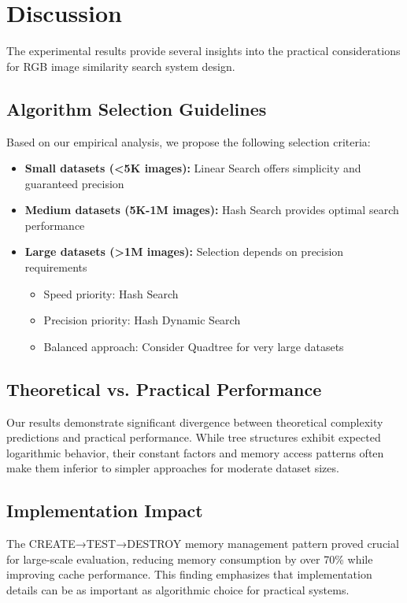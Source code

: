 \documentclass{sbc2023}
\begin{document}
\begin{table}[H]
\section{Discussion}
\label{sec:discussion}

The experimental results provide several insights into the practical considerations for RGB image similarity search system design.

\subsection{Algorithm Selection Guidelines}

Based on our empirical analysis, we propose the following selection criteria:

\begin{itemize}
    \item \textbf{Small datasets (<5K images):} Linear Search offers simplicity and guaranteed precision
    \item \textbf{Medium datasets (5K-1M images):} Hash Search provides optimal search performance
    \item \textbf{Large datasets (>1M images):} Selection depends on precision requirements
    \begin{itemize}
        \item Speed priority: Hash Search
        \item Precision priority: Hash Dynamic Search  
        \item Balanced approach: Consider Quadtree for very large datasets
    \end{itemize}
\end{itemize}

\subsection{Theoretical vs. Practical Performance}

Our results demonstrate significant divergence between theoretical complexity predictions and practical performance. While tree structures exhibit expected logarithmic behavior, their constant factors and memory access patterns often make them inferior to simpler approaches for moderate dataset sizes.

\subsection{Implementation Impact}

The CREATE→TEST→DESTROY memory management pattern proved crucial for large-scale evaluation, reducing memory consumption by over 70\% while improving cache performance. This finding emphasizes that implementation details can be as important as algorithmic choice for practical systems.


\end{table}
\end{document}
